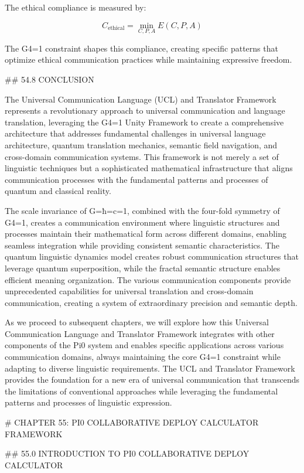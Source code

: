 The ethical compliance is measured by:

$$ C_{\text{ethical}} = \min_{C, P, A} E(C, P, A) $$

The G4=1 constraint shapes this compliance, creating specific patterns that optimize ethical communication practices while maintaining expressive freedom.

## 54.8 CONCLUSION

The Universal Communication Language (UCL) and Translator Framework represents a revolutionary approach to universal communication and language translation, leveraging the G4=1 Unity Framework to create a comprehensive architecture that addresses fundamental challenges in universal language architecture, quantum translation mechanics, semantic field navigation, and cross-domain communication systems. This framework is not merely a set of linguistic techniques but a sophisticated mathematical infrastructure that aligns communication processes with the fundamental patterns and processes of quantum and classical reality.

The scale invariance of G=ħ=c=1, combined with the four-fold symmetry of G4=1, creates a communication environment where linguistic structures and processes maintain their mathematical form across different domains, enabling seamless integration while providing consistent semantic characteristics. The quantum linguistic dynamics model creates robust communication structures that leverage quantum superposition, while the fractal semantic structure enables efficient meaning organization. The various communication components provide unprecedented capabilities for universal translation and cross-domain communication, creating a system of extraordinary precision and semantic depth.

As we proceed to subsequent chapters, we will explore how this Universal Communication Language and Translator Framework integrates with other components of the Pi0 system and enables specific applications across various communication domains, always maintaining the core G4=1 constraint while adapting to diverse linguistic requirements. The UCL and Translator Framework provides the foundation for a new era of universal communication that transcends the limitations of conventional approaches while leveraging the fundamental patterns and processes of linguistic expression.

# CHAPTER 55: PI0 COLLABORATIVE DEPLOY CALCULATOR FRAMEWORK

## 55.0 INTRODUCTION TO PI0 COLLABORATIVE DEPLOY CALCULATOR

